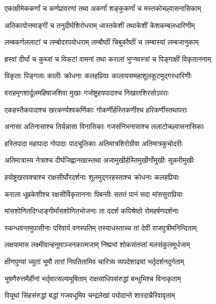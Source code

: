\twolineshloka
{एकाक्षीमेककर्णां च कर्णप्रावरणां तथा}
{अकर्णां शङ्कुकर्णां च मस्तकोच्छ्वासनासिकाम्} %

\twolineshloka
{अतिकायोत्तमाङ्गीं च तनुदीर्घशिरोधराम्}
{ध्वस्तकेशीं तथाकेशीं केशकम्बलधारिणीम्} %

\twolineshloka
{लम्बकर्णललाटां च लम्बोदरपयोधराम्}
{लम्बौष्ठीं चिबुकौष्ठीं च लम्बास्यां लम्बजानुकाम्} %

\twolineshloka
{ह्रस्वां दीर्घां च कुब्जां च विकटां वामनां तथा}
{करालां भुग्नवस्त्रां च पिङ्गाक्षीं विकृताननाम्} %

\twolineshloka
{विकृताः पिङ्गलाः कालीः क्रोधनाः कलहप्रियाः}
{कालायसमहाशूलकूटमुद्गरधारिणीः} %

\twolineshloka
{वराहमृगशार्दूलमहिषाजशिवा मुखाः}
{गजोष्ट्रहयपादाश्च निखातशिरसोऽपराः} %

\twolineshloka
{एकहस्तैकपादाश्च खरकर्ण्यश्वकर्णिकाः}
{गोकर्णीर्हस्तिकर्णीश्च हरिकर्णीस्तथापराः} %

\twolineshloka
{अनासा अतिनासाश्च तिर्यन्नासा विनासिकाः}
{गजसंनिभनासाश्च ललाटोच्छ्वासनासिकाः} %

\twolineshloka
{हस्तिपादा महापादा गोपादाः पादचूलिकाः}
{अतिमात्रशिरोग्रीवा अतिमात्रकुचोदरीः} %

\twolineshloka
{अतिमात्रास्य नेत्राश्च दीर्घजिह्वानखास्तथा}
{अजामुखीर्हस्तिमुखीर्गोमुखीः सूकरीमुखीः} %

\twolineshloka
{हयोष्ट्रखरवक्त्राश्च राक्षसीर्घोरदर्शनाः}
{शूलमुद्गरहस्ताश्च क्रोधनाः कलहप्रियाः} %

\twolineshloka
{कराला धूम्रकेशीश्च रक्षसीर्विकृताननाः}
{पिबन्तीः सततं पानं सदा मांससुराप्रियाः} %

\twolineshloka
{मांसशोणितदिग्धाङ्गीर्मांसशोणितभोजनाः}
{ता ददर्श कपिश्रेष्ठो रोमहर्षणदर्शनाः} %

\twolineshloka
{स्कन्धवन्तमुपासीनाः परिवार्य वनस्पतिम्}
{तस्याधस्ताच्च तां देवीं राजपुत्रीमनिन्दिताम्} %

\twolineshloka
{लक्षयामास लक्ष्मीवान्हनूमाञ्जनकात्मजाम्}
{निष्प्रभां शोकसंतप्तां मलसंकुलमूर्धजाम्} %

\twolineshloka
{क्षीणपुण्यां च्युतां भूमौ तारां निपतितामिव}
{चारित्र्य व्यपदेशाढ्यां भर्तृदर्शनदुर्गताम्} %

\twolineshloka
{भूषणैरुत्तमैर्हीनां भर्तृवात्सल्यभूषिताम्}
{राक्षसाधिपसंरुद्धां बन्धुभिश्च विनाकृताम्} %

\twolineshloka
{वियूथां सिंहसंरुद्धां बद्धां गजवधूमिव}
{चन्द्रलेखां पयोदान्ते शारदाभ्रैरिवावृताम्} %

